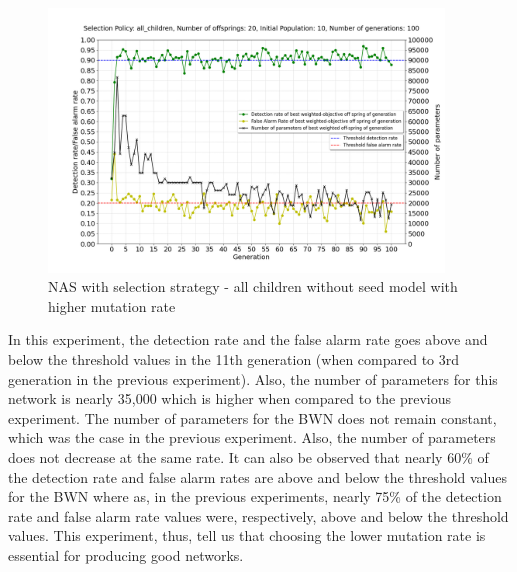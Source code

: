 \begin{figure}[h!]
    \centering
        \includegraphics[width=1.0\linewidth, height=7cm]{BachelorMasterThesis/ExperimentsAndResults/Figures/all_children/all_children_3_3_1_no_seed_model_mutation_rate_15_30_10_15.png}
        \caption{NAS with selection strategy - all children without seed model with higher mutation rate}
        \label{fig:all_children_3_3_1_no_seed_model_mutation_rate_15_30_10_15}
\end{figure}

In this experiment, the detection rate and the false alarm rate goes above and below the threshold values in the 11th generation (when compared to 3rd generation in the previous experiment). Also, the number of parameters for this network is nearly 35,000 which is higher when compared to the previous experiment. The number of parameters for the BWN does not remain constant, which was the case in the previous experiment. Also, the number of parameters does not decrease at the same rate. It can also be observed that nearly 60\% of the detection rate and false alarm rates are above and below the threshold values for the BWN where as, in the previous experiments, nearly 75\% of the detection rate and false alarm rate values were, respectively, above and below the threshold values. This experiment, thus, tell us that choosing the lower mutation rate is essential for producing good networks. 

